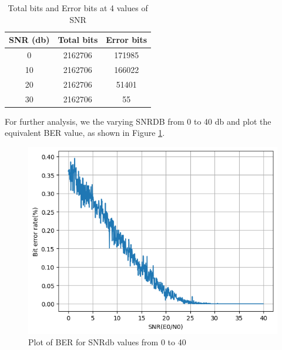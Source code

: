 \begin{table}[htbp]
    \centering
    \begin{tabular}{|c|c|c|}
        \hline
        SNR (db) & Total bits & Error bits \\ \hline
        0        & 2162706    &  171985 \\ \hline
        10       & 2162706    &  166022 \\ \hline
        20       & 2162706    &  51401  \\ \hline
        30       & 2162706    &  55     \\ \hline
    \end{tabular}
    \caption{Total bits and Error bits at 4 values of SNR}
    \label{errors}
\end{table}

For further analysis, we the varying SNRDB from 0 to 40 db and plot the equivalent BER value, as shown in Figure \ref{ber}.

\begin{figure}[htbp]
    \centering
    \includegraphics[width=\linewidth]{../Source/results/ber}
    \caption{Plot of BER for SNRdb values from 0 to 40}
    \label{ber}
\end{figure}


